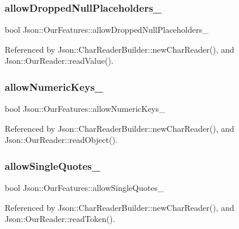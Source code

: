 \subsubsection{\texorpdfstring{allow\+Dropped\+Null\+Placeholders\+\_\+}{allowDroppedNullPlaceholders\_}}
{\footnotesize\ttfamily bool Json\+::\+Our\+Features\+::allow\+Dropped\+Null\+Placeholders\+\_\+}



Referenced by Json\+::\+Char\+Reader\+Builder\+::new\+Char\+Reader(), and Json\+::\+Our\+Reader\+::read\+Value().

\mbox{\label{classJson_1_1OurFeatures_af6973fc7e774ce2d634ba99442aeb91a_af6973fc7e774ce2d634ba99442aeb91a}} 
\subsubsection{\texorpdfstring{allow\+Numeric\+Keys\+\_\+}{allowNumericKeys\_}}
{\footnotesize\ttfamily bool Json\+::\+Our\+Features\+::allow\+Numeric\+Keys\+\_\+}



Referenced by Json\+::\+Char\+Reader\+Builder\+::new\+Char\+Reader(), and Json\+::\+Our\+Reader\+::read\+Object().

\mbox{\label{classJson_1_1OurFeatures_abbd6c196d7a22e2a360a59887eda4610_abbd6c196d7a22e2a360a59887eda4610}} 
\subsubsection{\texorpdfstring{allow\+Single\+Quotes\+\_\+}{allowSingleQuotes\_}}
{\footnotesize\ttfamily bool Json\+::\+Our\+Features\+::allow\+Single\+Quotes\+\_\+}



Referenced by Json\+::\+Char\+Reader\+Builder\+::new\+Char\+Reader(), and Json\+::\+Our\+Reader\+::read\+Token().


